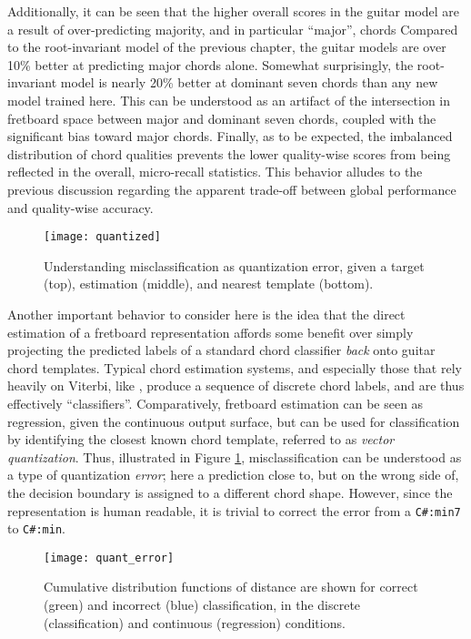Additionally, it can be seen that the higher overall scores in the guitar model are a result of over-predicting majority, and in particular ``major'', chords
Compared to the root-invariant model of the previous chapter, the guitar models are over 10\% better at predicting major chords alone.
Somewhat surprisingly, the root-invariant model is nearly 20\% better at dominant seven chords than any new model trained here.
This can be understood as an artifact of the intersection in fretboard space between major and dominant seven chords, coupled with the significant bias toward major chords.
Finally, as to be expected, the imbalanced distribution of chord qualities prevents the lower quality-wise scores from being reflected in the overall, micro-recall statistics.
This behavior alludes to the previous discussion regarding the apparent trade-off between global performance and quality-wise accuracy.


\begin{figure}[t!]
  \centering
  \centerline{\texttt{[image: quantized]}}
\caption{Understanding misclassification as quantization error, given a target (top), estimation (middle), and nearest template (bottom).}
\label{fig:quantized}
%
\end{figure}


Another important behavior to consider here is the idea that the direct estimation of a fretboard representation affords some benefit over simply projecting the predicted labels of a standard chord classifier \emph{back} onto guitar chord templates.
Typical chord estimation systems, and especially those that rely heavily on Viterbi, like \cite{Cho2014Improved}, produce a sequence of discrete chord labels, and are thus effectively ``classifiers''.
Comparatively, fretboard estimation can be seen as regression, given the continuous output surface, but can be used for classification by identifying the closest known chord template, referred to as \emph{vector quantization}.
Thus, illustrated in Figure \ref{fig:quantized}, misclassification can be understood as a type of quantization \emph{error};
here a prediction close to, but on the wrong side of, the decision boundary is assigned to a different chord shape.
However, since the representation is human readable, it is trivial to correct the error from a \texttt{C\#:min7} to \texttt{C\#:min}.


\begin{figure}[t!]
  \centering
  \centerline{\texttt{[image: quant\_error]}}
\caption{Cumulative distribution functions of distance are shown for correct (green) and incorrect (blue) classification, in the discrete (classification) and continuous (regression) conditions.}
\label{fig:quant_error}
%
\end{figure}

